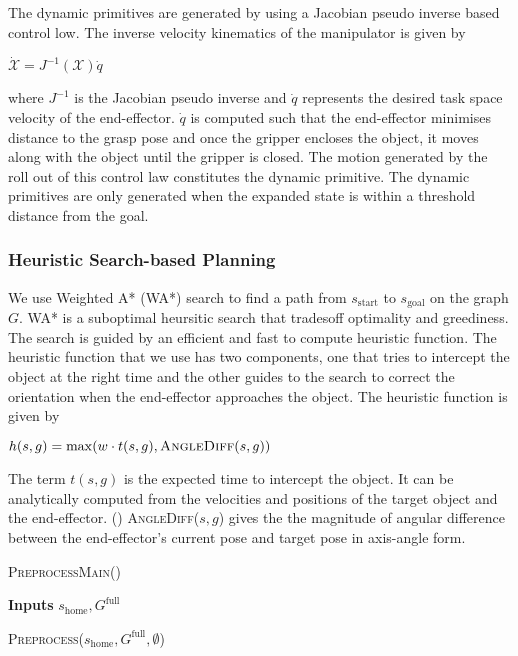 The dynamic primitives are generated by using a Jacobian pseudo inverse based control low. The inverse velocity kinematics of the manipulator is given by
\begin{center}
$\dot{\mathcal{X}} = J^{-1}(\mathcal{X})\dot{q}$
\end{center}

where $J^{-1}$ is the Jacobian pseudo inverse and $\dot{q}$ represents the desired task space velocity of the end-effector. $\dot{q}$ is computed such that the end-effector minimises distance to the grasp pose and once the gripper encloses the object, it moves along with the object until the gripper is closed. The motion generated by the roll out of this control law constitutes the dynamic primitive. The dynamic primitives are only generated when the expanded state is within a threshold distance from the goal. 

\subsubsection{Heuristic Search-based Planning}
We use Weighted A* (WA*) search to find a path from $s_{\textrm{start}}$ to $s_{\textrm{goal}}$ on the graph $G$. WA* is a suboptimal heursitic search that tradesoff optimality and greediness. The search is guided by an efficient and fast to compute heuristic function. The heuristic function that we use has two components, one that tries to intercept the object at the right time and the other guides to the search to correct the orientation when the end-effector approaches the object. The heuristic function is given by

\begin{center}
$h(s,g) = \max (w \cdot t(s,g), \textsc{AngleDiff}(s,g))$
\end{center}


The term $t(s,g)$ is the expected time to intercept the object. It can be analytically computed from the velocities and positions of the target object and the end-effector.
()
\textsc{AngleDiff}($s,g$) gives the the magnitude of angular difference between the end-effector's current pose and target pose in axis-angle form.

\begin{algorithm}
\caption{\textsc{PreprocessMain()}}\label{alg:1}
\hspace*{\algorithmicindent} \textbf{Inputs} $s_{\textrm{home}}, G^{\textrm{full}}$ \\
\begin{algorithmic}[1]
\State \textsc{Preprocess}($s_{\textrm{home}},G^{\textrm{full}},\emptyset$)
\end{algorithmic}
\end{algorithm}

